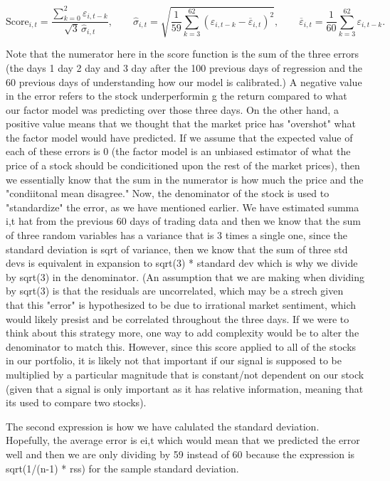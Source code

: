 \[
\mathrm{Score}_{i,t}
=
\frac{\displaystyle\sum_{k=0}^{2}\varepsilon_{i,t-k}}
     {\sqrt{3}\,\widehat{\sigma}_{i,t}},
\qquad
\widehat{\sigma}_{i,t}
=
\sqrt{\frac{1}{59}
\sum_{k=3}^{62}
\left(\varepsilon_{i,t-k}-\overline{\varepsilon}_{i,t}\right)^2},
\qquad
\overline{\varepsilon}_{i,t}
=
\frac{1}{60}\sum_{k=3}^{62}\varepsilon_{i,t-k}.
\]

Note that the numerator here in the score function is the sum of the three errors (the days 1 day 2 day and 3 day after the 100 previous days of regression and the 60 previous days of understanding how our model is calibrated.) A negative value in the error refers to the stock underperformin g the return compared to what our factor model was predicting over those three days. On the other hand, a positive value means that we thought that the market price has "overshot" what the factor model would have predicted. If we assume that the expected value of each of these errors is 0 (the factor model is an unbiased estimator of what the price of a stock should be condicitioned upon the rest of the market prices), then we essentially know that the sum in the numerator is how much the price and the "condiitonal mean disagree." Now, the denominator of the stock is used to "standardize" the error, as we have mentioned earlier. We have estimated summa i,t hat from the previous 60 days of trading data and then we know that the sum of three random variables has a variance that is 3 times a single one, since the standard deviation is sqrt of variance, then we know that the sum of three std devs is equivalent in expansion to sqrt(3) * standard dev which is why we divide by sqrt(3) in the denominator.
(An assumption that we are making when dividing by sqrt(3) is that the residuals are uncorrelated, which may be a strech given that this "error" is hypothesized to be due to irrational market sentiment, which would likely presist and be correlated throughout the three days. If we were to think about this strategy more, one way to add complexity would be to alter the denominator to match this. However, since this score applied to all of the stocks in our portfolio, it is likely not that important if our signal is supposed to be multiplied by a particular magnitude that is constant/not dependent on our stock (given that a signal is only important as it has relative information, meaning that its used to compare two stocks). 

The second expression is how we have calulated the standard deviation. Hopefully, the average error is ei,t which would mean that we predicted the error well and then we are only dividing by 59 instead of 60 because the expression is sqrt(1/(n-1) * rss) for the sample standard deviation. 

